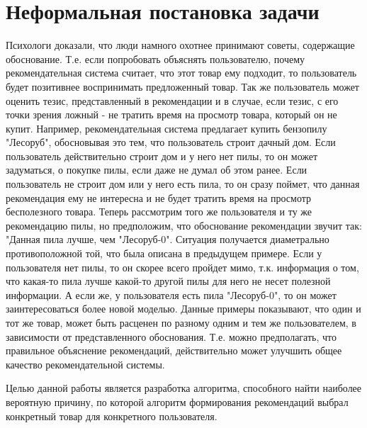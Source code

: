 \documentclass[12pt,a4paper]{report}
\begin{document}
\section{Неформальная постановка задачи}
Психологи доказали, что люди намного охотнее принимают советы, содержащие обоснование. Т.е. если попробовать объяснять пользователю, почему рекомендательная система считает, что этот товар ему подходит, то пользователь будет позитивнее воспринимать предложенный товар. Так же пользователь может оценить тезис, представленный в рекомендации и в случае, если тезис, с его точки зрения ложный - не тратить время на просмотр товара, который он не купит.
Например, рекомендательная система предлагает купить бензопилу "Лесоруб", обосновывая это тем, что пользователь строит дачный дом. Если пользователь действительно строит дом и у него нет пилы, то он может задуматься, о покупке пилы, если даже не думал об этом ранее. Если пользователь не строит дом или у него есть пила, то он сразу поймет, что данная рекомендация ему не интересна и не будет тратить время на просмотр бесполезного товара.
Теперь рассмотрим того же пользователя и ту же рекомендацию пилы, но предположим, что обоснование рекомендации звучит так: "Данная пила лучше, чем "Лесоруб-0".
Ситуация получается диаметрально противоположной той, что была описана в предыдущем примере. Если у пользователя нет пилы, то он скорее всего пройдет мимо, т.к. информация о том, что какая-то пила лучше какой-то другой пилы для него не несет полезной информации. А если же, у пользователя есть пила "Лесоруб-0", то он может заинтересоваться более новой моделью.
Данные примеры показывают, что один и тот же товар, может быть расценен по разному одним и тем же пользователем, в зависимости от представленного обоснования. Т.е. можно предполагать, что правильное объяснение рекомендаций, действительно может улучшить общее качество рекомендательной системы.

Целью данной работы является разработка алгоритма, способного найти наиболее вероятную причину, по которой алгоритм формирования рекомендаций выбрал конкретный товар для конкретного пользователя.
\end{document}
